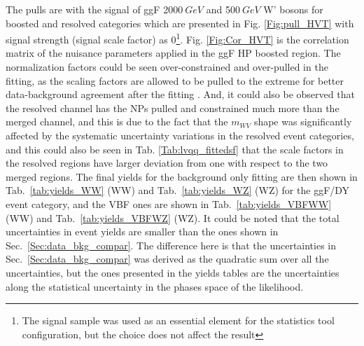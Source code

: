 The pulls are with the signal of ggF 2000$~GeV$ and 500$~GeV$ W' bosons for boosted and resolved categories which are presented in Fig. \ref{Fig:pull_HVT} with signal strength (signal scale factor) as 0\footnote{The signal sample was used as an essential element for the statistics tool configuration, but the choice does not affect the result}. Fig. \ref{Fig:Cor_HVT} is the correlation matrix of the nuisance parameters applied in the ggF HP boosted region. The normalization factors could be seen over-constrained and over-pulled in the fitting, as the scaling factors are allowed to be pulled to the extreme for better data-background agreement after the fitting \cite{EXOT-2016-28}. And, it could also be observed that the resolved channel has the NPs pulled and constrained much more than the merged channel, and this is due to the fact that the $m_{WV}$ shape was significantly affected by the systematic uncertainty variations in the resolved event categories, and this could also be seen in Tab. \ref{Tab:lvqq_fittedsf} that the scale factors in the resolved regions have larger deviation from one with respect to the two merged regions. The final yields for the background only fitting are then shown in Tab.~\ref{tab:yields_WW} (WW) and Tab.~\ref{tab:yields_WZ} (WZ) for the ggF/DY event category, and the VBF ones are shown in Tab.~\ref{tab:yields_VBFWW} (WW) and Tab.~\ref{tab:yields_VBFWZ} (WZ). It could be noted that the total uncertainties in event yields are smaller than the ones shown in Sec.~\ref{Sec:data_bkg_compar}. The difference here is that the uncertainties in Sec.~\ref{Sec:data_bkg_compar} was derived as the quadratic sum over all the uncertainties, but the ones presented in the yields tables are the uncertainties along the statistical uncertainty in the phases space of the likelihood.  
